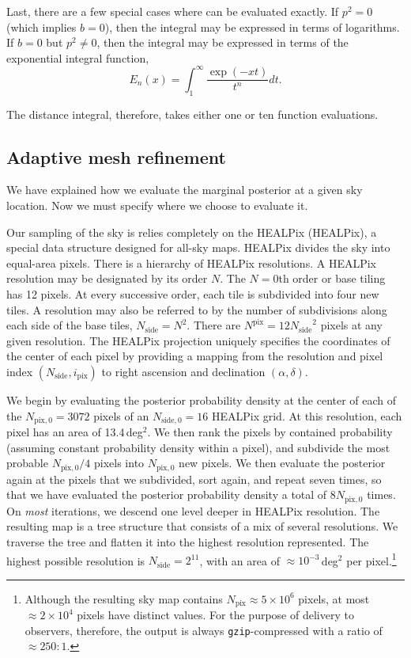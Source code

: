 \documentclass{iopart}
\begin{document}
Last, there are a few special cases where  can be evaluated exactly. If $p^2=0$ (which implies $b = 0$), then the integral may be expressed in terms of logarithms. If $b = 0$ but $p^2 \neq 0$, then the integral may be expressed in terms of the exponential integral function,
%
\begin{equation}
    E_n(x) = \int_1^\infty \frac{\exp (-xt)}{t^n} dt.
\end{equation}

The distance integral, therefore, takes either one or ten function evaluations.

\subsection{Adaptive mesh refinement}

We have explained how we evaluate the marginal posterior at a given sky location. Now we must specify where we choose to evaluate it.

Our sampling of the sky is relies completely on the \acl{HEALPix} (\acs{HEALPix}), a special data structure designed for all\nobreakdashes-sky maps. \ac{HEALPix} divides the sky into equal\nobreakdashes-area pixels. There is a hierarchy of \ac{HEALPix} resolutions. A HEALPix resolution may be designated by its order $N$. The $N=0$th order or base tiling has 12 pixels. At every successive order, each tile is subdivided into four new tiles. A resolution may also be referred to by the number of subdivisions along each side of the base tiles, $N_\mathrm{side} = N^2$. There are $N^\mathrm{pix} = 12 {N_\mathrm{side}}^2$ pixels at any given resolution. The \ac{HEALPix} projection uniquely specifies the coordinates of the center of each pixel by providing a mapping from the resolution and pixel index $(N_\mathrm{side}, i_\mathrm{pix})$ to right ascension and declination $(\alpha, \delta)$.

We begin by evaluating the posterior probability density at the center of each of the $N_{\mathrm{pix},0} = 3072$ pixels of an $N_{\mathrm{side},0}=16$ \ac{HEALPix} grid. At this resolution, each pixel has an area of 13.4\,deg$^2$. We then rank the pixels by contained probability (assuming constant probability density within a pixel), and subdivide the most probable $N_{\mathrm{pix},0}/4$ pixels into $N_{\mathrm{pix},0}$ new pixels. We then evaluate the posterior again at the pixels that we subdivided, sort again, and repeat seven times, so that we have evaluated the posterior probability density a total of $8 N_{\mathrm{pix},0}$ times. On \emph{most} iterations, we descend one level deeper in \ac{HEALPix} resolution. The resulting map is a tree structure that consists of a mix of several resolutions. We traverse the tree and flatten it into the highest resolution represented. The highest possible resolution is $N_\mathrm{side}=2^{11}$, with an area of $\approx 10^{-3}$\,deg$^2$ per pixel.\footnote{Although the resulting sky map contains $N_\mathrm{pix} \approx 5\times10^6$ pixels, at most $\approx 2\times10^4$ pixels have distinct values. For the purpose of delivery to observers, therefore, the output is always \texttt{gzip}\nobreakdashes-compressed with a ratio of $\approx 250:1$.}
\end{document}
